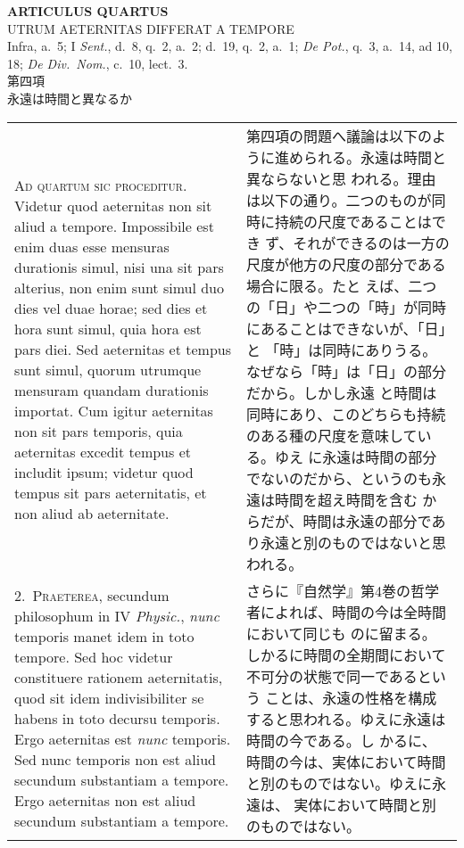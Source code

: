 \documentclass[10pt]{jsarticle} %
\begin{document}
\newpage
{}

\begin{center}
 {\Large {\bf ARTICULUS QUARTUS}}\\
 {\large UTRUM AETERNITAS DIFFERAT A TEMPORE}\\
 {\footnotesize Infra, a.~5; I {\itshape Sent.}, d.~8, q.~2, a.~2;
 d.~19, q.~2, a.~1; {\itshape De Pot.}, q.~3, a.~14, ad 10, 18;
 {\itshape De Div.~Nom.}, c.~10, lect.~3.}\\
 {\Large 第四項\\永遠は時間と異なるか}
\end{center}

\begin{longtable}{p{21em}p{21em}}

{\huge A}{\scshape d quartum sic proceditur}. Videtur quod aeternitas non sit aliud a
tempore. Impossibile est enim duas esse mensuras durationis simul, nisi
una sit pars alterius, non enim sunt simul duo dies vel duae horae; sed
dies et hora sunt simul, quia hora est pars diei. Sed aeternitas et
tempus sunt simul, quorum utrumque mensuram quandam durationis
importat. Cum igitur aeternitas non sit pars temporis, quia aeternitas
excedit tempus et includit ipsum; videtur quod tempus sit pars
aeternitatis, et non aliud ab aeternitate.

&

第四項の問題へ議論は以下のように進められる。永遠は時間と異ならないと思
われる。理由は以下の通り。二つのものが同時に持続の尺度であることはでき
ず、それができるのは一方の尺度が他方の尺度の部分である場合に限る。たと
えば、二つの「日」や二つの「時」が同時にあることはできないが、「日」と
「時」は同時にありうる。なぜなら「時」は「日」の部分だから。しかし永遠
と時間は同時にあり、このどちらも持続のある種の尺度を意味している。ゆえ
に永遠は時間の部分でないのだから、というのも永遠は時間を超え時間を含む
からだが、時間は永遠の部分であり永遠と別のものではないと思われる。

\\

2.~{\scshape Praeterea}, secundum philosophum in IV {\it Physic.},
{\itshape nunc} temporis manet idem in toto tempore. Sed hoc videtur
constituere rationem aeternitatis, quod sit idem indivisibiliter se
habens in toto decursu temporis. Ergo aeternitas est {\itshape nunc}
temporis. Sed nunc temporis non est aliud secundum substantiam a
tempore. Ergo aeternitas non est aliud secundum substantiam a tempore.


&

さらに『自然学』第4巻の哲学者によれば、時間の今は全時間において同じも
のに留まる。しかるに時間の全期間において不可分の状態で同一であるという
ことは、永遠の性格を構成すると思われる。ゆえに永遠は時間の今である。し
かるに、時間の今は、実体において時間と別のものではない。ゆえに永遠は、
実体において時間と別のものではない。



\end{longtable}
\end{document}
